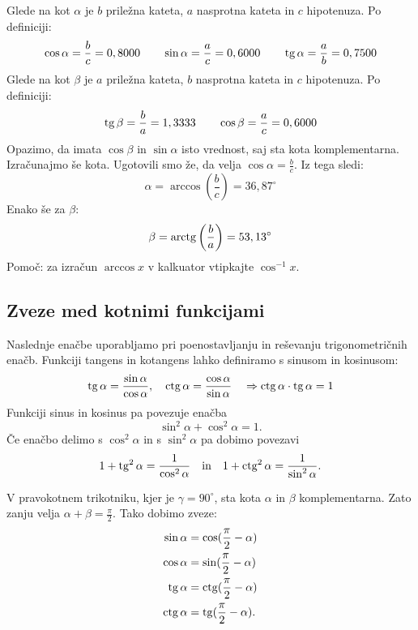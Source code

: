 \begin{resitev}
Glede na kot $\alpha$ je $b$ priležna kateta, $a$ nasprotna kateta in $c$ hipotenuza. Po definiciji:
\begin{equation*}
\cos\alpha= \frac{b}{c}= 0,8000 \quad \quad
\sin\alpha = \frac{a}{c}= 0,6000 \quad \quad
\operatorname{tg} \alpha= \frac{a}{b}= 0,7500
\end{equation*}
Glede na kot $\beta$ je $a$ priležna kateta, $b$ nasprotna kateta in $c$ hipotenuza. Po definiciji:
\begin{equation*}
\operatorname{tg}\beta= \frac{b}{a}= 1,3333 \quad \quad
\cos\beta = \frac{a}{c}= 0,6000
\end{equation*}
Opazimo, da imata $\cos\beta$ in $\sin\alpha$ isto vrednost, saj sta kota komplementarna.
Izračunajmo še kota. Ugotovili smo že, da velja $\cos\alpha= \frac{b}{c}$. Iz tega sledi:
\begin{equation*}
\alpha= \arccos \left(\frac{b}{c}\right) = 36,87^{\circ}
\end{equation*}
Enako še za $\beta$:
\begin{equation*}
\beta= \operatorname{arctg} \left(\frac{b}{a}\right) = 53,13^{\circ}
\end{equation*}
Pomoč: za izračun $\arccos x$ v kalkuator vtipkajte $\cos^{-1}x$.
\end{resitev}

\subsection{Zveze med kotnimi funkcijami}

Naslednje enačbe uporabljamo pri poenostavljanju in reševanju trigonometričnih enačb. Funkciji tangens in kotangens lahko definiramo s sinusom in kosinusom:
\begin{equation*}
\operatorname{tg} \alpha = \frac{\sin \alpha}{\cos \alpha}, \quad
\operatorname{ctg} \alpha = \frac{\cos \alpha}{\sin \alpha} \quad 
\Rightarrow \operatorname{ctg} \alpha \cdot \operatorname{tg} \alpha = 1
\end{equation*}
Funkciji sinus in kosinus pa povezuje enačba
\begin{equation*}
\sin^2 \alpha + \cos^2 \alpha = 1.
\end{equation*}
Če enačbo delimo s $\cos^2\alpha$ in s $\sin^2\alpha$  pa dobimo povezavi
\begin{equation*}
1+ \operatorname{tg}^2 \alpha = \frac{1}{\cos^2\alpha}\quad \text{in} \quad
1+ \operatorname{ctg}^2 \alpha= \frac{1}{\sin^2\alpha}.
\end{equation*}

V pravokotnem trikotniku, kjer je $\gamma={90}^{\circ}$, sta kota $\alpha$ in $\beta$ komplementarna. Zato zanju velja $\alpha+\beta= \frac{\pi}{2}$. Tako dobimo zveze:
\begin{align*}
\sin\alpha &= \cos(\frac{\pi}{2}- \alpha) \\
\cos\alpha &= \sin(\frac{\pi}{2}- \alpha) \\
\operatorname{tg} \alpha &= \operatorname{ctg}(\frac{\pi}{2}- \alpha) \\
\operatorname{ctg}\alpha &= \operatorname{tg}(\frac{\pi}{2}- \alpha).
\end{align*}

